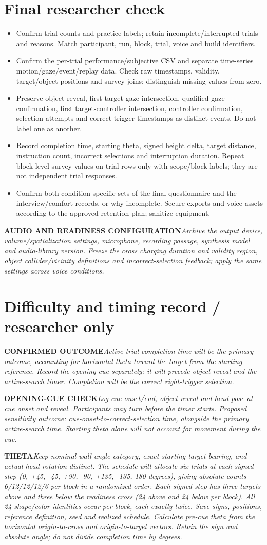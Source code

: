 \documentclass[11pt,letterpaper]{article}
\newcommand{\step}[1]{\Needspace{7\baselineskip}\section{#1}}
\newcommand{\action}[2]{\Needspace{3\baselineskip}\par{\color{ActionInk}\textbf{#1}\enspace\textit{#2}}\par}
\begin{document}
\step{Final researcher check}
{\color{ActionInk}\itshape
\begin{itemize}
\item Confirm trial counts and practice labels; retain incomplete/interrupted trials and reasons. Match participant, run, block, trial, voice and build identifiers.
\item Confirm the per-trial performance/subjective CSV and separate time-series motion/gaze/event/replay data. Check raw timestamps, validity, target/object positions and survey joins; distinguish missing values from zero.
\item Preserve object-reveal, first target-gaze intersection, qualified gaze confirmation, first target-controller intersection, controller confirmation, selection attempts and correct-trigger timestamps as distinct events. Do not label one as another.
\item Record completion time, starting theta, signed height delta, target distance, instruction count, incorrect selections and interruption duration. Repeat block-level survey values on trial rows only with scope/block labels; they are not independent trial responses.
\item Confirm both condition-specific sets of the final questionnaire and the interview/comfort records, or why incomplete. Secure exports and voice assets according to the approved retention plan; sanitize equipment.
\end{itemize}
}
\action{AUDIO AND READINESS CONFIGURATION}{Archive the output device, volume/spatialization settings, microphone, recording passage, synthesis model and audio-library version. Freeze the cross charging duration and validity region, object collider/vicinity definitions and incorrect-selection feedback; apply the same settings across voice conditions.}
\step{Difficulty and timing record / researcher only}
\action{CONFIRMED OUTCOME}{Active trial completion time will be the primary outcome, accounting for horizontal theta toward the target from the starting reference. Record the opening cue separately: it will precede object reveal and the active-search timer. Completion will be the correct right-trigger selection.}
\action{OPENING-CUE CHECK}{Log cue onset/end, object reveal and head pose at cue onset and reveal. Participants may turn before the timer starts. Proposed sensitivity outcome: cue-onset-to-correct-selection time, alongside the primary active-search time. Starting theta alone will not account for movement during the cue.}
\action{THETA}{Keep nominal wall-angle category, exact starting target bearing, and actual head rotation distinct. The schedule will allocate six trials at each signed step (0, +45, -45, +90, -90, +135, -135, 180 degrees), giving absolute counts 6/12/12/12/6 per block in a randomized order. Each signed step has three targets above and three below the readiness cross (24 above and 24 below per block). All 24 shape/color identities occur per block, each exactly twice. Save signs, positions, reference definition, seed and realized schedule. Calculate pre-cue theta from the horizontal origin-to-cross and origin-to-target vectors. Retain the sign and absolute angle; do not divide completion time by degrees.}
\end{document}

